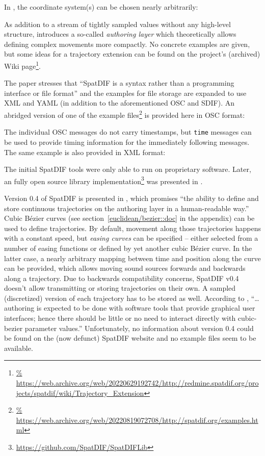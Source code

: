 \noindent
In \parencite{peters2008spatdif}, the coordinate system(s) can be chosen nearly
arbitrarily:


\noindent
As addition to a stream of tightly sampled values
without any high-level structure,
\parencite{peters2013spatdif}
introduces a so-called
\emph{authoring layer}
which theoretically allows defining complex movements more compactly.
No concrete examples are given,
but some ideas for a trajectory extension can be found on
the project's (archived) Wiki page\footnote{\url{%
https://web.archive.org/web/20220629192742/http://redmine.spatdif.org/projects/spatdif/wiki/Trajectory_Extension}}.

The paper stresses that
``SpatDIF is a syntax rather than a programming interface or file format''
and the examples for file storage
are expanded to use XML and YAML
(in addition to the aforementioned OSC and SDIF).
An abridged version of one of the
example files\footnote{\url{%
https://web.archive.org/web/20220819072708/http://spatdif.org/examples.html}}
is provided here in OSC format:


\noindent
The individual OSC messages do not carry timestamps,
but \texttt{time} messages can be used to provide
timing information for the immediately following messages.
The same example is also provided in XML format:


\noindent
The initial SpatDIF tools were only able to run on proprietary software.
Later, an fully open source library
implementation\footnote{\url{https://github.com/SpatDIF/SpatDIFLib}}
was presented in \parencite{miyama2013spatdif}.

Version 0.4 of SpatDIF is presented in
\parencite{schacher2016spatdif},
which promises
``the ability to define
and store continuous trajectories on the authoring layer in
a human-readable way.''
Cubic Bézier curves (see section~\ref{euclidean/bezier::doc} in the appendix)
can be used to define trajectories.
By default, movement along those trajectories happens with a constant speed,
but \emph{easing curves} can be specified --
either selected from a number of easing functions
or defined by yet another cubic Bézier curve.
In the latter case, a nearly arbitrary mapping between time and position along
the curve can be provided, which allows moving
sound sources forwards and backwards along a trajectory.
Due to backwards compatibility concerns,
SpatDIF v0.4 doesn't allow transmitting or storing
trajectories on their own.
A sampled (discretized) version of each trajectory has to be stored as well.
According to \textcite{schacher2016spatdif},
``\dots authoring is expected to
be done with software tools that provide graphical user interfaces;
hence there should be little or no need to interact
directly with cubic-bezier parameter values.''
Unfortunately, no information about version 0.4 could be found on the
(now defunct)
SpatDIF website
and no example files seem to be available.


